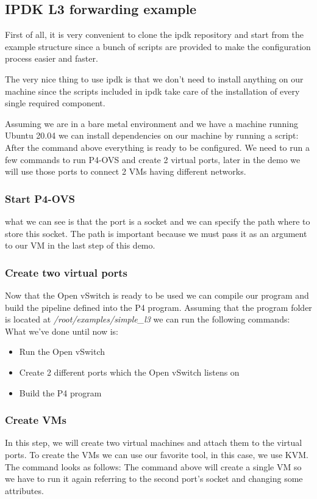 \documentclass[../sn.tex]{subfiles}
\begin{document}
\subsection{IPDK L3 forwarding example}
First of all, it is very convenient to clone the \acrshort{ipdk} repository and start from the example structure since a bunch of scripts are provided to make the configuration process easier and faster.

The very nice thing to use \acrshort{ipdk} is that we don't need to install anything on our machine since the scripts included in \acrshort{ipdk} take care of the installation of every single required component.

Assuming we are in a bare metal environment and we have a machine running Ubuntu 20.04 we can install dependencies on our machine by running a script:
After the command above everything is ready to be configured.
We need to run a few commands to run P4-OVS and create 2 virtual ports, later in the demo we will use those ports to connect 2 VMs having different networks.
\subsubsection*{Start P4-OVS}
what we can see is that the port is a socket and we can specify the path where to store this socket.
The path is important because we must pass it as an argument to our VM in the last step of this demo.
\subsubsection*{Create two virtual ports}
Now that the Open vSwitch is ready to be used we can compile our program and build the pipeline defined into the P4 program.
Assuming that the program folder is located at \emph{/root/examples/simple\_l3} we can run the following commands:
What we've done until now is: 
\begin{itemize}
    \item Run the Open vSwitch
    \item Create 2 different ports which the Open vSwitch listens on
    \item Build the P4 program
\end{itemize}
\subsubsection*{Create VMs}
In this step, we will create two virtual machines and attach them to the virtual ports.
To create the VMs we can use our favorite tool, in this case, we use KVM.
The command looks as follows:
The command above will create a single VM so we have to run it again referring to the second port's socket and changing some attributes.
\end{document}
